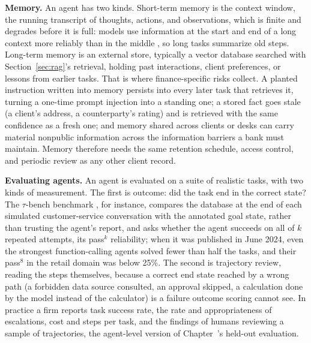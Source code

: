 \documentclass[../ai_in_finance]{subfiles}
\begin{document}
\textbf{Memory.} An agent has two kinds. Short-term memory is the context window, the running transcript of thoughts, actions, and observations, which is finite and degrades before it is full: models use information at the start and end of a long context more reliably than in the middle \parencite{liu2024lost}, so long tasks summarize old steps. Long-term memory is an external store, typically a vector database searched with Section~\ref{sec:rag}'s retrieval, holding past interactions, client preferences, or lessons from earlier tasks. That is where finance-specific risks collect. A planted instruction written into memory persists into every later task that retrieves it, turning a one-time prompt injection into a standing one; a stored fact goes stale (a client's address, a counterparty's rating) and is retrieved with the same confidence as a fresh one; and memory shared across clients or desks can carry material nonpublic information across the information barriers a bank must maintain. Memory therefore needs the same retention schedule, access control, and periodic review as any other client record.

\textbf{Evaluating agents.} An agent is evaluated on a suite of realistic tasks, with two kinds of measurement. The first is outcome: did the task end in the correct state? The $\tau$-bench benchmark \parencite{yao2024taubench}, for instance, compares the database at the end of each simulated customer-service conversation with the annotated goal state, rather than trusting the agent's report, and asks whether the agent succeeds on all of $k$ repeated attempts, its pass$^k$ reliability; when it was published in June 2024, even the strongest function-calling agents solved fewer than half the tasks, and their pass$^8$ in the retail domain was below 25\%. The second is trajectory review, reading the steps themselves, because a correct end state reached by a wrong path (a forbidden data source consulted, an approval skipped, a calculation done by the model instead of the calculator) is a failure outcome scoring cannot see. In practice a firm reports task success rate, the rate and appropriateness of escalations, cost and steps per task, and the findings of humans reviewing a sample of trajectories, the agent-level version of Chapter~'s held-out evaluation.
\end{document}
